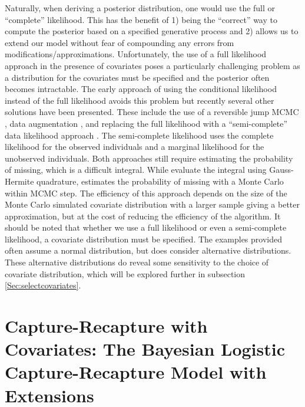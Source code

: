 \documentclass[
  12pt,
]{article}
\begin{document}
Naturally, when deriving a posterior distribution, one would use the
full or ``complete'' likelihood. This has the benefit of 1) being the
``correct'' way to compute the posterior based on a specified generative
process and 2) allows us to extend our model without fear of compounding
any errors from modifications/approximations. Unfortunately, the use of
a full likelihood approach in the presence of covariates poses a
particularly challenging problem as a distribution for the covariates
must be specified and the posterior often becomes intractable. The early
approach of using the conditional likelihood instead of the full
likelihood avoids this problem but recently several other solutions have
been presented. These include the use of a reversible jump MCMC
\citep{king_bayesian_2008}, data augmentation
\citep{royle_analysis_2007,royle_analysis_2009}, and replacing the full
likelihood with a ``semi-complete'' data likelihood approach
\citep{king_capturerecapture_2016}. The semi-complete likelihood uses
the complete likelihood for the observed individuals and a marginal
likelihood for the unobserved individuals. Both approaches still require
estimating the probability of missing, which is a difficult integral.
While \citep{king_capturerecapture_2016} evaluate the integral using
Gauss-Hermite quadrature, \cite{bonner_mcmcmc_2014} estimates the
probability of missing with a Monte Carlo within MCMC step. The
efficiency of this approach depends on the size of the Monte Carlo
simulated covariate distribution with a larger sample giving a better
approximation, but at the cost of reducing the efficiency of the
algorithm. It should be noted that whether we use a full likelihood or
even a semi-complete likelihood, a covariate distribution must be
specified. The examples provided often assume a normal distribution, but
\cite{royle_analysis_2009} does consider alternative distributions.
These alternative distributions do reveal some sensitivity to the choice
of covariate distribution, which will be explored further in subsection
\ref{Sec:selectcovariates}.

\newpage
\section{Capture-Recapture with Covariates: The Bayesian Logistic Capture-Recapture Model with Extensions}
\label{sec:CRwithCovariates}
\end{document}
